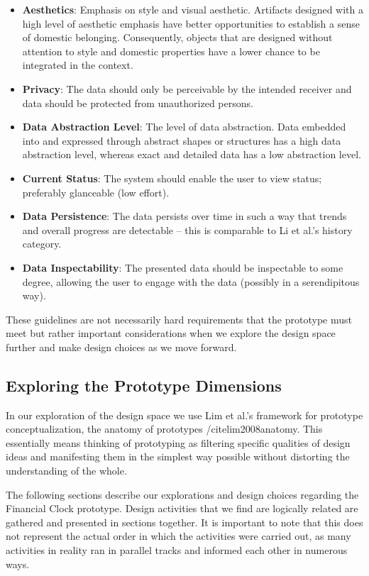 \vspace{12pt}
\begin{itemize}
	\item\textbf{Aesthetics}: Emphasis on style and visual aesthetic. Artifacts designed with a high level of aesthetic emphasis have better opportunities to establish a sense of domestic belonging. Consequently, objects that are designed without attention to style and domestic properties have a lower chance to be integrated in the context.
	\item\textbf{Privacy}: The data should only be perceivable by the intended receiver and data should be protected from unauthorized persons.
	\item\textbf{Data Abstraction Level}: The level of data abstraction. Data embedded into and expressed through abstract shapes or structures has a high data abstraction level, whereas exact and detailed data has a low abstraction level.
	\item\textbf{Current Status}: The system should enable the user to view status; preferably glanceable (low effort).
	\item\textbf{Data Persistence}: The data persists over time in such a way that trends and overall progress are detectable -- this is comparable to Li et al.’s history category.
	\item\textbf{Data Inspectability}: The presented data should be inspectable to some degree, allowing the user to engage with the data (possibly in a serendipitous way).
\end{itemize}
\vspace{12pt}

These guidelines are not necessarily hard requirements that the prototype must meet but rather important considerations when we explore the design space further and make design choices as we move forward.

\subsection{Exploring the Prototype Dimensions}
In our exploration of the design space we use Lim et al.’s framework for prototype conceptualization, the anatomy of prototypes /cite{lim2008anatomy}. This essentially means thinking of prototyping as filtering specific qualities of design ideas and manifesting them in the simplest way possible without distorting the understanding of the whole.

The following sections describe our explorations and design choices regarding the Financial Clock prototype. Design activities that we find are logically related are gathered and presented in sections together. It is important to note that this does not represent the actual order in which the activities were carried out, as many activities in reality ran in parallel tracks and informed each other in numerous ways.

